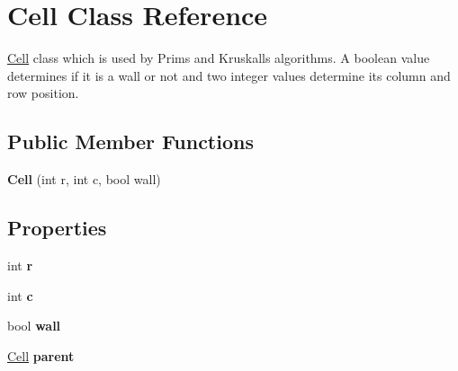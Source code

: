 \hypertarget{class_cell}{}\section{Cell Class Reference}
\label{class_cell}


\mbox{\hyperlink{class_cell}{Cell}} class which is used by Prim\textquotesingle{}s and Kruskall\textquotesingle{}s algorithms. A boolean value determines if it is a wall or not and two integer values determine its column and row position.  


\subsection*{Public Member Functions}
\begin{DoxyCompactItemize}
\item 
\mbox{\label{class_cell_a70964a36282986efabb68af91eabc565}} 
{\bfseries Cell} (int r, int c, bool wall)
\end{DoxyCompactItemize}
\subsection*{Properties}
\begin{DoxyCompactItemize}
\item 
\mbox{\label{class_cell_a81d999788ce709a81c137089e226c44d}} 
int {\bfseries r}
\item 
\mbox{\label{class_cell_ae9671b84fa5163649d6a0ad9bc1f3837}} 
int {\bfseries c}
\item 
\mbox{\label{class_cell_a72e7ccf215991fc29d0eb67960551263}} 
bool {\bfseries wall}
\item 
\mbox{\label{class_cell_a3188f94392e7423478be6faf3038d6c5}} 
\mbox{\hyperlink{class_cell}{Cell}} {\bfseries parent}
\end{DoxyCompactItemize}


